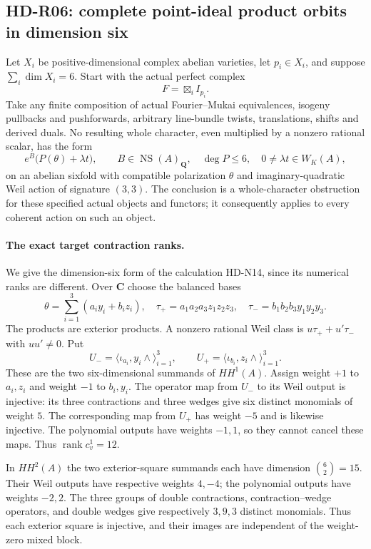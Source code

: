\subsection{HD-R06: complete point-ideal product orbits in dimension six}
\label{sec:point-ideal-sixfold-orbits}

Let $X_i$ be positive-dimensional complex abelian varieties, let
$p_i\in X_i$, and suppose $\sum_i\dim X_i=6$. Start with the actual
perfect complex
\[
                         F=\boxtimes_i I_{p_i}.
\]
Take any finite composition of actual Fourier--Mukai equivalences,
isogeny pullbacks and pushforwards, arbitrary line-bundle twists,
translations, shifts and derived duals. No resulting whole character,
even multiplied by a nonzero rational scalar, has the form
\[
 e^B\bigl(P(\theta)+\lambda t\bigr),\qquad
 B\in\operatorname{NS}(A)_{\mathbf Q},\quad
 \deg P\le6,\quad 0\ne\lambda t\in W_K(A),                 \tag{R06.1}
\]
on an abelian sixfold with compatible polarization $\theta$ and
imaginary-quadratic Weil action of signature $(3,3)$.
The conclusion is a whole-character obstruction for these specified
actual objects and functors; it consequently applies to every coherent
action on such an object.

\paragraph{The exact target contraction ranks.}
We give the dimension-six form of the calculation HD-N14, since its
numerical ranks are different. Over $\mathbf C$ choose the balanced
bases
\[
 \theta=\sum_{i=1}^3(a_i y_i+b_i z_i),\quad
 \tau_+=a_1a_2a_3z_1z_2z_3,\quad
 \tau_-=b_1b_2b_3y_1y_2y_3.
\]
The products are exterior products. A nonzero rational Weil class is
$u\tau_++u'\tau_-$ with $uu'\ne0$. Put
\[
 U_-=\langle\iota_{a_i},y_i\wedge\rangle_{i=1}^3,
 \qquad U_+=\langle\iota_{b_i},z_i\wedge\rangle_{i=1}^3.
\]
These are the two six-dimensional summands of $HH^1(A)$. Assign
weight $+1$ to $a_i,z_i$ and weight $-1$ to $b_i,y_i$.
The operator map from $U_-$ to its Weil output is injective: its
three contractions and three wedges give six distinct monomials of
weight $5$. The corresponding map from $U_+$ has weight $-5$ and
is likewise injective. The polynomial outputs have weights $-1,1$,
so they cannot cancel these maps. Thus $\operatorname{rank}c_v^1=12$.

In $HH^2(A)$ the two exterior-square summands each have dimension
$\binom62=15$. Their Weil outputs have respective weights $4,-4$;
the polynomial outputs have weights $-2,2$. The three groups of
double contractions, contraction--wedge operators, and double wedges
give respectively $3,9,3$ distinct monomials. Thus each exterior
square is injective, and their images are independent of the
weight-zero mixed block.

